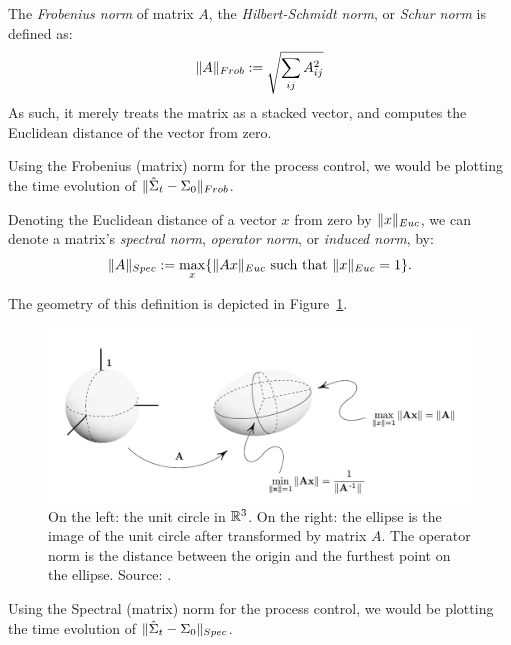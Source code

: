 \begin{definition}
The \emph{Frobenius norm} of matrix $A$, \aka the \emph{Hilbert-Schmidt norm}, or \emph{Schur norm} is defined as:
\begin{align}
	\Vert A \Vert_{Frob}:= \sqrt{\sum_{ij} A_{ij}^2} 
\end{align}
As such, it merely treats the matrix as a stacked vector, and computes the Euclidean distance of the vector from zero.
\end{definition}
Using the Frobenius (matrix) norm for the process control, we would be plotting the time evolution of $\Vert \hat{\Sigma}_t-\Sigma_0 \Vert_{Frob}$.


\begin{definition}
Denoting the Euclidean distance of a vector $x$ from zero by $\Vert x \Vert_{Euc}$, we can denote a matrix's \emph{spectral norm}, \aka \emph{operator norm}, or \emph{induced norm}, by:
\begin{align}
	\Vert A \Vert_{Spec} := \max_x \{ \Vert Ax \Vert_{Euc} \text{ such that } \Vert x \Vert_{Euc}=1 \}.
\end{align}
\end{definition}
The geometry of this definition is depicted in Figure~\ref{fig:operator_norm}.

\begin{figure}
\centering
\includegraphics[width=0.7\linewidth]{art/operator_norm}
\caption[Geometry of Spectral Matrix Norms]{
\footnotesize
On the left: the unit circle in $\mathbb{R}^3$. 
On the right: the ellipse is the image of the unit circle after transformed by matrix $A$. The operator norm is the distance between the origin and the furthest point on the ellipse. 
\newline Source: \cite{meyer_matrix_2001}.}
\label{fig:operator_norm}
\end{figure}

Using the Spectral (matrix) norm for the process control, we would be plotting the time evolution of $\Vert \hat{\Sigma}_t-\Sigma_0 \Vert_{Spec}$.


